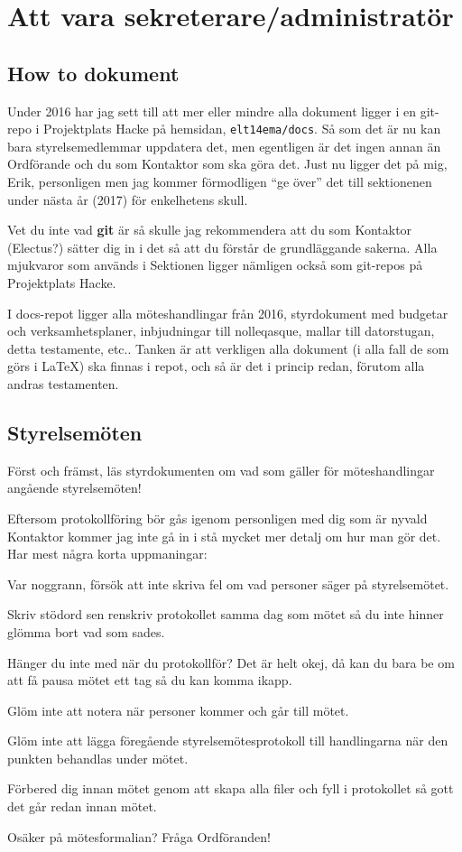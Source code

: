 \documentclass[10pt]{article}
\begin{document}
\section{Att vara sekreterare/administratör}
\subsection{How to dokument}
Under 2016 har jag sett till att mer eller mindre alla dokument ligger i en git-repo i Projektplats Hacke på hemsidan, \texttt{elt14ema/docs}. Så som det är nu kan bara styrelsemedlemmar uppdatera det, men egentligen är det ingen annan än Ordförande och du som Kontaktor som ska göra det. Just nu ligger det på mig, Erik, personligen men jag kommer förmodligen ``ge över'' det till sektionenen under nästa år (2017) för enkelhetens skull.

Vet du inte vad \textbf{git} är så skulle jag rekommendera att du som Kontaktor (Electus?) sätter dig in i det så att du förstår de grundläggande sakerna. Alla mjukvaror som används i Sektionen ligger nämligen också som git-repos på Projektplats Hacke.

I docs-repot ligger alla möteshandlingar från 2016, styrdokument med budgetar och verksamhetsplaner, inbjudningar till nolleqasque, mallar till datorstugan, detta testamente, etc.. Tanken är att verkligen alla dokument (i alla fall de som görs i \LaTeX) ska finnas i repot, och så är det i princip redan, förutom alla andras testamenten.
\newpage
\subsection{Styrelsemöten}
Först och främst, läs styrdokumenten om vad som gäller för möteshandlingar angående styrelsemöten!

Eftersom protokollföring bör gås igenom personligen med dig som är nyvald Kontaktor kommer jag inte gå in i stå mycket mer detalj om hur man gör det. Har mest några korta uppmaningar:
\begin{tightdashlist}
    \item Var noggrann, försök att inte skriva fel om vad personer säger på styrelsemötet.
    \item Skriv stödord sen renskriv protokollet samma dag som mötet så du inte hinner glömma bort vad som sades.
    \item Hänger du inte med när du protokollför? Det är helt okej, då kan du bara be om att få pausa mötet ett tag så du kan komma ikapp.
    \item Glöm inte att notera när personer kommer och går till mötet.
    \item Glöm inte att lägga föregående styrelsemötesprotokoll till handlingarna när den punkten behandlas under mötet.
    \item Förbered dig innan mötet genom att skapa alla filer och fyll i protokollet så gott det går redan innan mötet.
    \item Osäker på mötesformalian? Fråga Ordföranden!
\end{tightdashlist}
\end{document}
